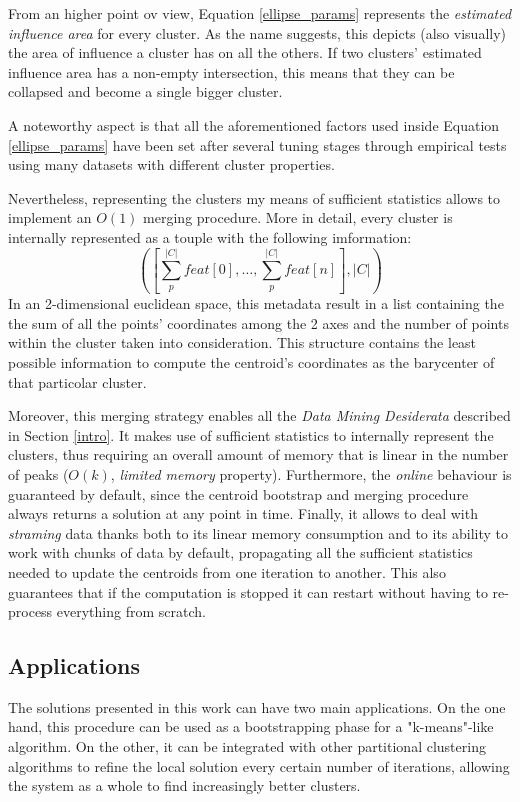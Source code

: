From an higher point ov view, Equation \ref{ellipse_params} represents the \emph{estimated influence area} 
for every cluster. As the name suggests, this depicts (also visually) the area of influence a cluster
has on all the others. If two clusters' estimated influence area has a non-empty intersection, this
means that they can be collapsed and become a single bigger cluster.


A noteworthy aspect is that all the aforementioned factors used inside Equation \ref{ellipse_params} have
been set after several tuning stages through empirical tests using many datasets with different
cluster properties.

Nevertheless, representing the clusters my means of sufficient statistics allows to implement an $O(1)$
merging procedure. More in detail, every cluster is internally represented as a touple with the
following imformation:
\begin{equation*}
    \left(\left[\sum_{p}^{|C|} feat[0],\dots,\sum_{p}^{|C|} feat[n]\right],|C|\right)
\end{equation*}
In an 2-dimensional euclidean space, this metadata result in a list containing the the sum of all the
points' coordinates among the 2 axes and the number of points within the cluster taken into consideration.
This structure contains the least possible information to compute the centroid's coordinates as the
barycenter of that particolar cluster.  

Moreover, this merging strategy enables all the \emph{Data Mining Desiderata} described in Section 
\ref{intro}. It makes use of sufficient statistics to internally represent the clusters, thus 
requiring an overall amount of memory that is linear in the number of peaks ($O(k)$, \emph{limited memory}
property). Furthermore, the \emph{online} behaviour is guaranteed by default, since the centroid
bootstrap and merging procedure always returns a solution at any point in time. Finally, it allows
to deal with \emph{straming} data thanks both to its linear memory consumption and to its ability to
work with chunks of data by default, propagating all the sufficient statistics needed to update the 
centroids from one iteration to another. This also guarantees that if the computation is stopped
it can restart without having to re-process everything from scratch.


\subsection*{Applications}
The solutions presented in this work can have two main applications. On the one hand,
this procedure can be used as a bootstrapping phase for a  "k-means"-like algorithm. 
On the other, it can be integrated with other partitional clustering algorithms to
refine the local solution every certain number of iterations, allowing the system as a
whole to find increasingly better clusters.